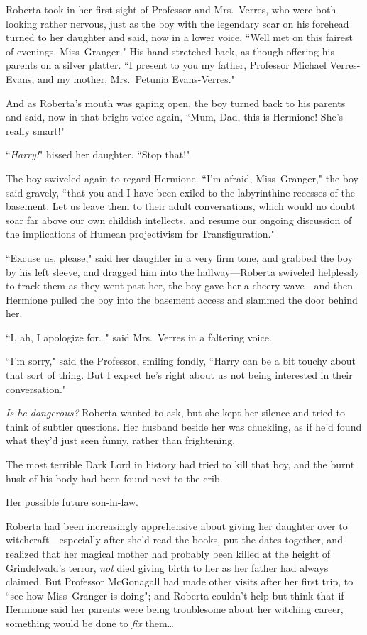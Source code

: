 Roberta took in her first sight of Professor and Mrs.~Verres, who were both looking rather nervous, just as the boy with the legendary scar on his forehead turned to her daughter and said, now in a lower voice, ``Well met on this fairest of evenings, Miss~Granger." His hand stretched back, as though offering his parents on a silver platter. ``I present to you my father, Professor Michael Verres-Evans, and my mother, Mrs.~Petunia Evans-Verres."

And as Roberta's mouth was gaping open, the boy turned back to his parents and said, now in that bright voice again, ``Mum, Dad, this is Hermione! She's really smart!"

``\emph{Harry!}" hissed her daughter. ``Stop that!"

The boy swiveled again to regard Hermione. ``I'm afraid, Miss~Granger," the boy said gravely, ``that you and I have been exiled to the labyrinthine recesses of the basement. Let us leave them to their adult conversations, which would no doubt soar far above our own childish intellects, and resume our ongoing discussion of the implications of Humean projectivism for Transfiguration."

``Excuse us, please," said her daughter in a very firm tone, and grabbed the boy by his left sleeve, and dragged him into the hallway---Roberta swiveled helplessly to track them as they went past her, the boy gave her a cheery wave---and then Hermione pulled the boy into the basement access and slammed the door behind her.

``I, ah, I apologize for{\ldots}" said Mrs.~Verres in a faltering voice.

``I'm sorry," said the Professor, smiling fondly, ``Harry can be a bit touchy about that sort of thing. But I expect he's right about us not being interested in their conversation."

\emph{Is he dangerous?} Roberta wanted to ask, but she kept her silence and tried to think of subtler questions. Her husband beside her was chuckling, as if he'd found what they'd just seen funny, rather than frightening.

The most terrible Dark Lord in history had tried to kill that boy, and the burnt husk of his body had been found next to the crib.

Her possible future son-in-law.

Roberta had been increasingly apprehensive about giving her daughter over to witchcraft---especially after she'd read the books, put the dates together, and realized that her magical mother had probably been killed at the height of Grindelwald's terror, \emph{not} died giving birth to her as her father had always claimed. But Professor McGonagall had made other visits after her first trip, to ``see how Miss~Granger is doing"; and Roberta couldn't help but think that if Hermione said her parents were being troublesome about her witching career, something would be done to \emph{fix} them{\ldots}

